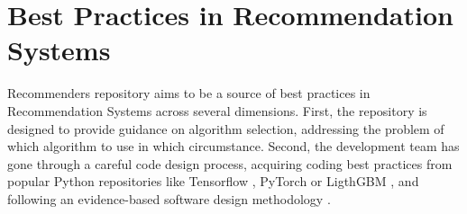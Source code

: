 \section{Best Practices in Recommendation Systems}

Recommenders repository aims to be a source of best practices in Recommendation Systems
across several dimensions. First, the repository is designed to provide guidance on algorithm
selection, addressing the problem of which algorithm to use in which circumstance. 
Second, the development team has gone through a careful code design process, acquiring 
coding best practices from popular Python repositories like Tensorflow 
\cite{abadi2016tensorflow}, PyTorch \cite{paszke2017automatic} or LigthGBM 
\cite{ke2017lightgbm}, and following an evidence-based software design methodology 
\cite{joeglekar2018evidence}.




